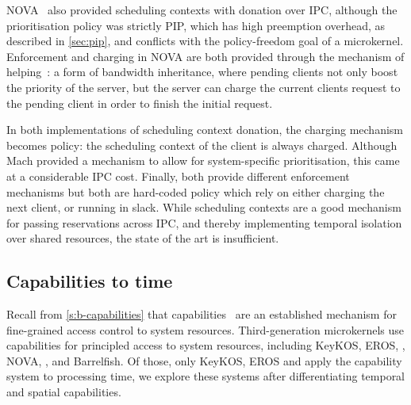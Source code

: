 NOVA~\citep{Steinberg_Kauer_10} also provided scheduling contexts with donation over \gls{IPC},
although the prioritisation policy was strictly \gls{PIP}, which has high preemption overhead, 
as described in \cref{sec:pip}, and conflicts with the
policy-freedom goal of a microkernel. 
Enforcement and charging
in NOVA are both provided through the mechanism of helping~\citep{Steinberg_BK_10}:  a form of
bandwidth inheritance, where pending clients not only boost the priority of the server, but the
server can charge the current clients request to the pending client in order to finish the initial request. 

In both implementations of scheduling context donation, the charging mechanism becomes policy: the
scheduling context of the client is always charged. Although Mach provided a mechanism to allow for
system-specific prioritisation, this came at a considerable IPC cost. Finally, both provide
different enforcement mechanisms but both are hard-coded policy which rely on either charging the
next client, or running in slack. While scheduling contexts are a good mechanism for
passing reservations across \gls{IPC}, and thereby implementing temporal isolation over shared
resources, the state of the art is insufficient.


\subsection{Capabilities to time}
\label{s:os-capabilities}

Recall from \cref{s:b-capabilities} that capabilities~\citep{Dennis_VanHorn_66} are an established mechanism for
fine-grained access control to system resources.
Third-generation microkernels use capabilities for principled access to system resources, including 
KeyKOS, EROS, \fiascooc, NOVA, \selfour, \composite and Barrelfish. Of those, only KeyKOS, EROS and
\composite apply the capability system to processing time, we explore these systems after
differentiating temporal and spatial capabilities. 

